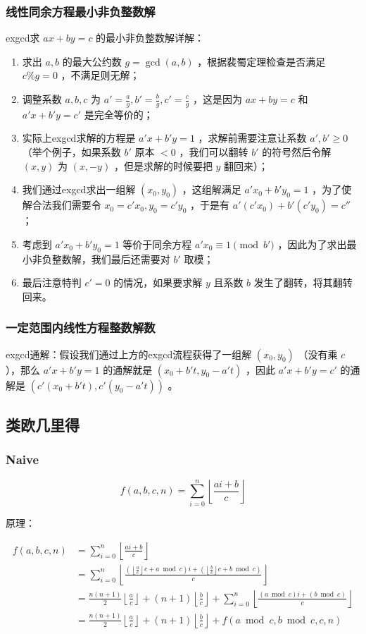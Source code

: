 \documentclass{article}
\begin{document}
\subsubsection{线性同余方程最小非负整数解}
exgcd求 $ax+by=c$ 的最小非负整数解详解：
\begin{enumerate}
    \item 求出 $a,b$ 的最大公约数 $g=\gcd(a,b)$ ，根据裴蜀定理检查是否满足 $c\% g=0$ ，不满足则无解；
    \item 调整系数 $a,b,c$ 为 $a'=\frac{a}{g},b'=\frac{b}{g},c'=\frac{c}{g}$ ，这是因为 $ax+by=c$ 和 $a'x+b'y=c'$ 是完全等价的；
    \item 实际上exgcd求解的方程是 $a'x+b'y=1$ ，求解前需要注意让系数 $a',b'\geq 0$ （举个例子，如果系数 $b'$ 原本 $<0$ ，我们可以翻转 $b'$ 的符号然后令解 $(x,y)$ 为 $(x,-y)$ ，但是求解的时候要把 $y$ 翻回来）；
    \item 我们通过exgcd求出一组解 $(x_0,y_0)$ ，这组解满足 $a'x_0+b'y_0=1$ ，为了使解合法我们需要令 $x_0=c'x_0,y_0=c'y_0$ ，于是有 $a'(c'x_0)+b'(c'y_0)=c''$ ；
    \item 考虑到 $a'x_0+b'y_0=1$ 等价于同余方程 $a'x_0\equiv 1\pmod{b'}$ ，因此为了求出最小非负整数解，我们最后还需要对 $b'$ 取模；
    \item 最后注意特判 $c'=0$ 的情况，如果要求解 $y$ 且系数 $b$ 发生了翻转，将其翻转回来。
\end{enumerate}

\subsubsection{一定范围内线性方程整数解数}
exgcd通解：假设我们通过上方的exgcd流程获得了一组解 $(x_0,y_0)$ （没有乘 $c$ ），那么 $a'x+b'y=1$ 的通解就是 $(x_0+b't,y_0-a't)$ ，因此 $a'x+b'y=c'$ 的通解是 $(c'(x_0+b't),c'(y_0-a't))$ 。

\subsection{类欧几里得}
\subsubsection{Naive}
$$
f(a,b,c,n)=\sum_{i=0}^n\left\lfloor \frac{ai+b}{c} \right\rfloor
$$

原理：

$$
\begin{aligned}
f(a,b,c,n)&=\sum_{i=0}^n\left\lfloor \frac{ai+b}{c} \right\rfloor\\
&=\sum_{i=0}^n\left\lfloor
\frac{\left(\left\lfloor\frac{a}{c}\right\rfloor c+a\bmod c\right)i+\left(\left\lfloor\frac{b}{c}\right\rfloor c+b\bmod c\right)}{c}\right\rfloor\\
&=\frac{n(n+1)}{2}\left\lfloor\frac{a}{c}\right\rfloor+(n+1)\left\lfloor\frac{b}{c}\right\rfloor+
\sum_{i=0}^n\left\lfloor\frac{\left(a\bmod c\right)i+\left(b\bmod c\right)}{c}
\right\rfloor\\
&=\frac{n(n+1)}{2}\left\lfloor\frac{a}{c}\right\rfloor
+(n+1)\left\lfloor\frac{b}{c}\right\rfloor+f(a\bmod c,b\bmod c,c,n)
\end{aligned}
$$

\end{document}
